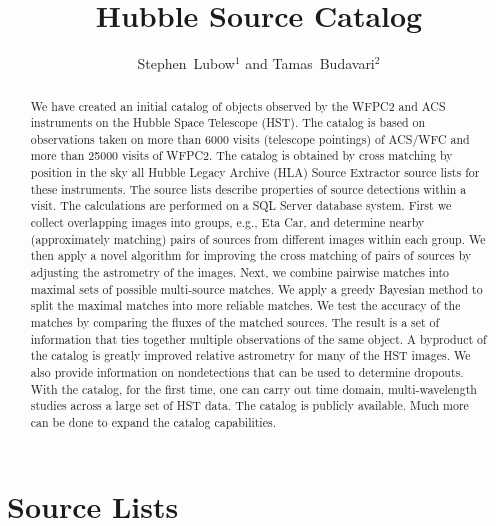 
\resetcounters




\title{Hubble Source Catalog}
\author{Stephen~Lubow$^1$ and Tamas~Budavari$^2$
}


\begin{abstract}
We have created an initial catalog of objects observed by the WFPC2 and ACS instruments on the Hubble Space Telescope (HST). The catalog is based on observations taken on more than 6000 visits (telescope pointings) of ACS/WFC and more than 25000 visits of WFPC2. The catalog is obtained by cross matching by position in the sky all Hubble Legacy Archive (HLA) Source Extractor source lists for these instruments. The source lists describe properties of source detections within a visit. The calculations are performed on a SQL Server database system. First we collect overlapping images into groups, e.g., Eta Car, and determine nearby (approximately matching) pairs of sources from different images within each group. We then apply a novel algorithm for improving the cross matching of pairs of sources by adjusting the astrometry of the images. Next, we combine pairwise matches into maximal sets of possible multi-source matches. We apply a greedy Bayesian method to split the maximal matches into more reliable matches. We test the accuracy of the matches by comparing the fluxes of the matched sources. The result is a set of information that ties together multiple observations of the same object. A byproduct of the catalog is greatly improved relative astrometry for many of the HST images. We also provide information on nondetections that can be used to determine dropouts. With the catalog, for the first time, one can carry out time domain, multi-wavelength studies across a large set of HST data. The catalog is publicly available. Much more can be done to expand the catalog capabilities.

\end{abstract}

\section{Source Lists}

